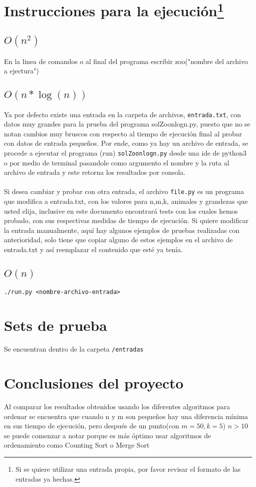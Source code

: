 \documentclass{article}
\begin{document}
		\section[title]{Instrucciones para la ejecución\footnote{Si se quiere utilizar una entrada propia, por favor revisar el formato de las entradas ya hechas.}}
		\subsection{$O(n^2)$}
		En la linea de comandos o al final del programa escribir zoo("nombre del archivo a ejectura")
		\subsection{$O(n*\log(n))$}		
		Ya por defecto existe una entrada en la carpeta de archivos, \texttt{entrada.txt}, con datos muy grandes para la prueba del programa solZoonlogn.py, puesto que no se notan cambios muy bruscos con respecto al tiempo de ejecución final al probar con datos de entrada pequeños. 
		Por ende, como ya hay un archivo de entrada, se procede a ejecutar el programa (run) \texttt{solZoonlogn.py} desde una ide de python3 o por medio de terminal pasandole como argumento el nombre y la ruta al archivo de entrada y este retorna los resultados por consola.\\\\
		Si desea cambiar y probar con otra entrada, el archivo \texttt{file.py} es un programa que modifica a entrada.txt, con los valores para n,m,k, animales y grandezas que usted elija, inclusive en este documento encontrará tests con los cuales hemos probado, con sus respectivas medidas de tiempo de ejecución. Si quiere modificar la entrada manualmente, aquí hay algunos ejemplos de pruebas realizadas con anterioridad, solo tiene que copiar alguno de estos ejemplos en el archivo de entrada.txt y así reemplazar el contenido que esté ya tenía.
		\subsection{$O(n)$}
			\texttt{./run.py <nombre-archivo-entrada>}
	\section{Sets de prueba}
		Se encuentran dentro de la carpeta \texttt{/entradas}
	\section{Conclusiones del proyecto}
Al comparar los resultados obtenidos usando los diferentes algoritmos para ordenar se encuentra que cuando n y m son pequeños hay una diferencia mínima en sus tiempo de ejecución, pero después de un punto(con $m=50,k=5$) $n>10$ se puede comenzar a notar porque es más óptimo usar algoritmos de ordenamiento como Counting Sort  o Merge Sort 
\end{document}

